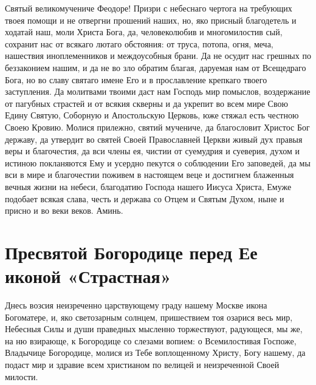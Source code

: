 

Святый великомучениче Феодоре! Призри с небеснаго чертога на требующих твоея помощи и не отвергни прошений наших, но, яко присный благодетель и ходатай наш, моли Христа Бога, да, человеколюбив и многомилостив сый, сохранит нас от всякаго лютаго обстояния: от труса, потопа, огня, меча, нашествия иноплеменников и междоусобныя брани. Да не осудит нас грешных по беззаконием нашим, и да не во зло обратим благая, даруемая нам от Всещедраго Бога, но во славу святаго имене Его и в прославление крепкаго твоего заступления. Да молитвами твоими даст нам Господь мир помыслов, воздержание от пагубных страстей и от всякия скверны и да укрепит во всем мире Свою Едину Святую, Соборную и Апостольскую Церковь, юже стяжал есть честною Своею Кровию. Молися прилежно, святий мучениче, да благословит Христос Бог державу, да утвердит во святей Своей Православней Церкви живый дух правыя веры и благочестия, да вси члены ея, чистии от суемудрия и суеверия, духом и истиною покланяются Ему и усердно пекутся о соблюдении Его заповедей, да мы вси в мире и благочестии поживем в настоящем веце и достигнем блаженныя вечныя жизни на небеси, благодатию Господа нашего Иисуса Христа, Емуже подобает всякая слава, честь и держава со Отцем и Святым Духом, ныне и присно и во веки веков. Аминь.
\mychapterending


 

\section{Пресвятой Богородице перед Ее иконой «Страстная»}
 



Днесь возсия неизреченно царствующему граду нашему Москве икона Богоматере, и, яко светозарным солнцем, пришествием тоя озарися весь мир, Небесныя Силы и души праведных мысленно торжествуют, радующеся, мы же, на ню взирающе, к Богородице со слезами вопием: о Всемилостивая Госпоже, Владычице Богородице, молися из Тебе воплощенному Христу, Богу нашему, да подаст мир и здравие всем христианом по велицей и неизреченной Своей милости.




